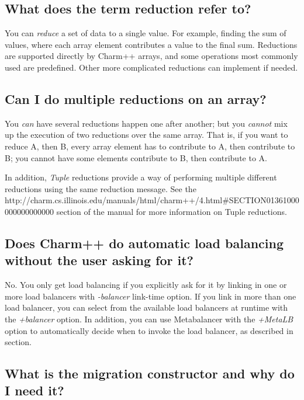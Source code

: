 \subsection{What does the term reduction refer to?}

You can {\em reduce} a set of data to a single value. For example,
finding the sum of values, where each array element contributes a value
to the final sum. Reductions are supported directly by Charm++ arrays, and some
operations most commonly used are predefined. Other more complicated reductions
can implement if needed.

\subsection{Can I do multiple reductions on an array?}

You {\em can} have several reductions happen one after another; but
you {\em cannot} mix up the execution of two reductions over the same
array. That is, if you want to reduce A, then B, every array element has
to contribute to A, then contribute to B; you cannot have some elements
contribute to B, then contribute to A.

In addition, {\em Tuple} reductions provide a way of performing multiple different
reductions using the same reduction message. See the
{http://charm.cs.illinois.edu/manuals/html/charm++/4.html\#SECTION01361000000000000000}
section of the manual for more information on Tuple reductions.

\subsection{Does Charm++ do automatic load balancing without the user asking
for it?}

No. You only get load balancing if you explicitly ask for it by
linking in one or more load balancers with {\em -balancer} link-time
option. If you link in more than one load balancer, you can select
from the available load balancers at runtime with the {\em +balancer}
option. In addition, you can use Metabalancer with the {\em +MetaLB} option to
automatically decide when to invoke the load balancer, as described in
section.

\subsection{What is the migration constructor and why do I need it?}


